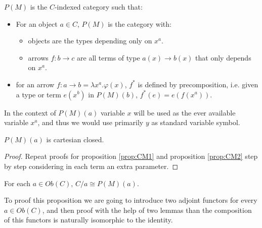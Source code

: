 \begin{definition} $P(M)$ is the $C$-indexed category such that:
  \begin{itemize}
  \item For an object $a\in C$, $P(M)$ is the category with:
    \begin{itemize}
    \item objects are the types depending only on $x^a$.
    \item arrows $f: b\to c$ are all terms of type $a(x)\to b(x)$ that only depends on $x^a$.
    \end{itemize}
  \item for an arrow $f:a\to b = \lambda x^a.\varphi(x)$, $f^*$ is defined by precomposition, i.e. given a type or term $e(x^b)$ in $P(M)(b)$, $f^*(e) = e(f(x^a))$.  
  \end{itemize}
\end{definition}

\begin{remark}
  In the context of $P(M)(a)$ variable $x$ will be used as the ever available variable $x^a$, and thus we would use primarily $y$ as standard variable symbol.
\end{remark}
\begin{proposition}
  $P(M)(a)$ is cartesian closed.
\end{proposition}
\begin{proof}
  Repeat proofs for proposition \ref{prop:CM1} and proposition \ref{prop:CM2} step by step considering in each term an extra parameter.
\end{proof}


\begin{proposition}\label{lemma:hyperdoc}
  For each $a\in Ob(C)$, $C/a\cong P(M)(a)$.
\end{proposition}

To proof this proposition we are going to introduce two adjoint functors for every $a\in Ob(C)$, and then proof with the help of two lemmas than the composition of this functors is naturally isomorphic to the identity.

